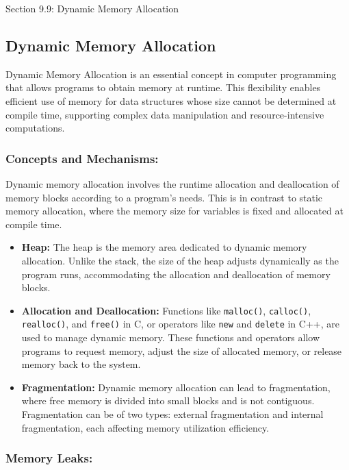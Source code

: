 \begin{notes}{Section 9.9: Dynamic Memory Allocation}
    \subsection*{Dynamic Memory Allocation}

    Dynamic Memory Allocation is an essential concept in computer programming that allows programs to obtain memory at runtime. This flexibility enables efficient use of memory for data structures 
    whose size cannot be determined at compile time, supporting complex data manipulation and resource-intensive computations. \vspace*{1em}
    
    \subsubsection*{Concepts and Mechanisms:}
    
    Dynamic memory allocation involves the runtime allocation and deallocation of memory blocks according to a program's needs. This is in contrast to static memory allocation, where the memory size 
    for variables is fixed and allocated at compile time.
    
    \begin{itemize}
        \item \textbf{Heap:} The heap is the memory area dedicated to dynamic memory allocation. Unlike the stack, the size of the heap adjusts dynamically as the program runs, accommodating the 
        allocation and deallocation of memory blocks.
        \item \textbf{Allocation and Deallocation:} Functions like \texttt{malloc()}, \texttt{calloc()}, \texttt{realloc()}, and \texttt{free()} in C, or operators like \texttt{new} and \texttt{delete} 
        in C++, are used to manage dynamic memory. These functions and operators allow programs to request memory, adjust the size of allocated memory, or release memory back to the system.
        \item \textbf{Fragmentation:} Dynamic memory allocation can lead to fragmentation, where free memory is divided into small blocks and is not contiguous. Fragmentation can be of two types: 
        external fragmentation and internal fragmentation, each affecting memory utilization efficiency.
    \end{itemize}
    
    \subsubsection*{Memory Leaks:}
    

\end{notes}
